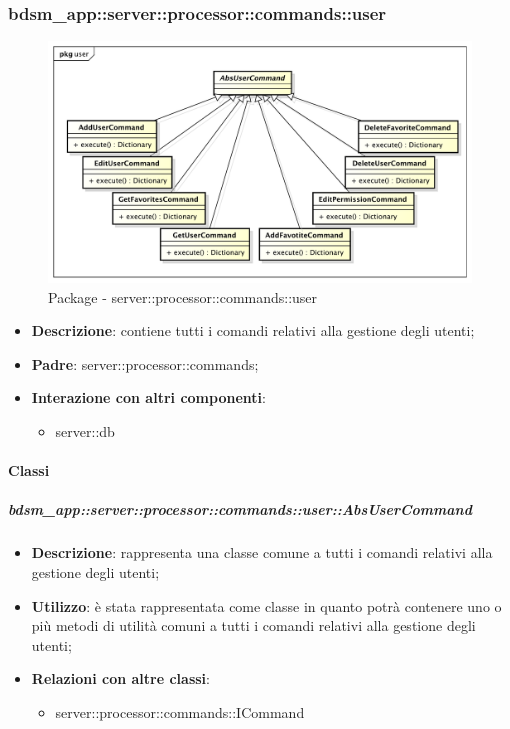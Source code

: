       \subsubsection{bdsm\_app::server::processor::commands::user} %
      \label{ssub:bdsm_app_server_processor_commands_user}
      \begin{figure}[!htbp]
      	\centering
      	\centerline{\includegraphics[scale=0.5]{./images/server/user.pdf}}
      	\caption{Package - server::processor::commands::user}
      \end{figure}

      \begin{itemize}
        \item \textbf{Descrizione}: contiene tutti i comandi relativi alla gestione degli utenti;
        \item \textbf{Padre}: server::processor::commands;
        \item \textbf{Interazione con altri componenti}:
          \begin{itemize}
            \item server::db
          \end{itemize}
      \end{itemize}

        \paragraph{Classi} %

        \subparagraph{bdsm\_app::server::processor::commands::user::AbsUserCommand} %
        \label{subp:bdsm_app_server_processor_commands_user_absusercommand}
        \begin{itemize}
          \item \textbf{Descrizione}: rappresenta una classe comune a tutti i comandi relativi alla gestione degli utenti;
          \item \textbf{Utilizzo}: è stata rappresentata come classe in quanto potrà contenere uno o più metodi di utilità comuni a tutti i comandi relativi alla gestione degli utenti;
          \item \textbf{Relazioni con altre classi}:
            \begin{itemize}
              \item server::processor::commands::ICommand
            \end{itemize}
        \end{itemize}

